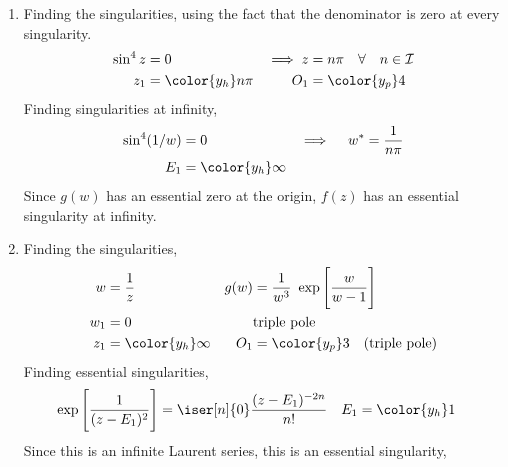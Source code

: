 \begin{enumerate}
    \item Finding the singularities, using the fact that the denominator is zero at
          every singularity.
          \begin{align}
              \sin^4 z   & = 0                                          &
              \implies z & = n\pi \quad \forall \quad n \in \mathcal{I}   \\
              z_1        & = \color{y_h} n\pi                           &
              O_1        & = \color{y_p} 4
          \end{align}
          Finding singularities at infinity,
          \begin{align}
              \sin^4(1/w)        & = 0                  &
              \implies \quad w^* & =  \frac{1}{n\pi}      \\
              E_1                & = \color{y_h} \infty
          \end{align}
          Since $ g(w) $ has an essential zero at the origin,
          $ f(z) $ has an essential singularity at infinity.

    \item Finding the singularities,
          \begin{align}
              w    & = \frac{1}{z}                                      &
              g(w) & = \frac{1}{w^3}\ \exp\Bigg[ \frac{w}{w - 1} \Bigg]   \\
              w_1  & = 0                                                &
                   & \text{triple pole}                                   \\
              z_1  & = \color{y_h} \infty                               &
              O_1  & = \color{y_p} 3 \quad  \text{(triple pole)}
          \end{align}
          Finding essential singularities,
          \begin{align}
              \exp\Bigg[ \frac{1}{(z - E_1)^2} \Bigg] & = \iser[n]{0}
              \frac{(z - E_1)^{-2n}}{n!}              &
              E_1                                     & = \color{y_h} 1
          \end{align}
          Since this is an infinite Laurent series, this is an essential singularity,


\end{enumerate}
